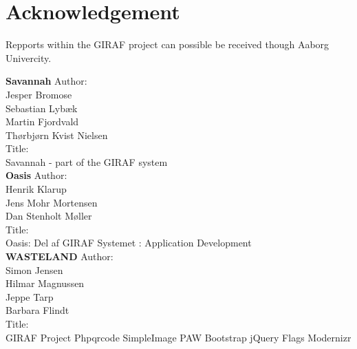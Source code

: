 \chapter{Acknowledgement}
\label{acknowledgement}
Repports within the GIRAF project can possible be received though Aaborg Univercity.   

\textbf{Savannah}
Author:\\ 
Jesper Bromose\\
Sebastian Lybæk\\
Martin Fjordvald\\
Thørbjørn Kvist Nielsen\\

Title:\\
Savannah - part of the GIRAF system\\

\textbf{Oasis}
Author:\\
Henrik Klarup\\
Jens Mohr Mortensen\\
Dan Stenholt Møller\\

Title:\\
Oasis: Del af GIRAF Systemet : Application Development\\


\textbf{WASTELAND}
Author:\\
Simon Jensen\\
Hilmar Magnussen\\
Jeppe Tarp\\
Barbara Flindt\\
Title:\\

GIRAF Project
Phpqrcode
SimpleImage
PAW
Bootstrap
jQuery
Flags
Modernizr
